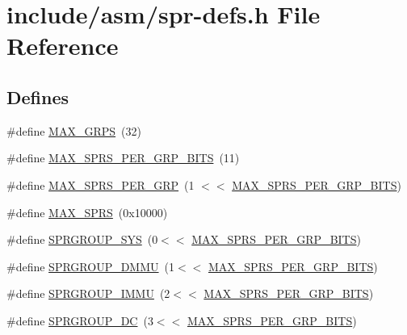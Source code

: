 \hypertarget{spr-defs_8h}{\section{include/asm/spr-\/defs.h \-File \-Reference}
\label{spr-defs_8h}
}
\subsection*{\-Defines}
\begin{DoxyCompactItemize}
\item 
\#define \hyperlink{spr-defs_8h_a44b278760f7184302d0070c0c39f5ba8}{\-M\-A\-X\-\_\-\-G\-R\-P\-S}~(32)
\item 
\#define \hyperlink{spr-defs_8h_adcfdf6c984d5e7577cd0086d5475bfb6}{\-M\-A\-X\-\_\-\-S\-P\-R\-S\-\_\-\-P\-E\-R\-\_\-\-G\-R\-P\-\_\-\-B\-I\-T\-S}~(11)
\item 
\#define \hyperlink{spr-defs_8h_aa4038b81fb32dbdd0ed4ab955ce78dec}{\-M\-A\-X\-\_\-\-S\-P\-R\-S\-\_\-\-P\-E\-R\-\_\-\-G\-R\-P}~(1 $<$$<$ \hyperlink{spr-defs_8h_adcfdf6c984d5e7577cd0086d5475bfb6}{\-M\-A\-X\-\_\-\-S\-P\-R\-S\-\_\-\-P\-E\-R\-\_\-\-G\-R\-P\-\_\-\-B\-I\-T\-S})
\item 
\#define \hyperlink{spr-defs_8h_ad0181a4ab5f0eecb77ac80cc860a3c1c}{\-M\-A\-X\-\_\-\-S\-P\-R\-S}~(0x10000)
\item 
\#define \hyperlink{spr-defs_8h_a5fa75eea4be01ea7e7fb6804ab4b2774}{\-S\-P\-R\-G\-R\-O\-U\-P\-\_\-\-S\-Y\-S}~(0$<$$<$ \hyperlink{spr-defs_8h_adcfdf6c984d5e7577cd0086d5475bfb6}{\-M\-A\-X\-\_\-\-S\-P\-R\-S\-\_\-\-P\-E\-R\-\_\-\-G\-R\-P\-\_\-\-B\-I\-T\-S})
\item 
\#define \hyperlink{spr-defs_8h_a9b7adb6ad3625a7d1f74f61b683b0a5e}{\-S\-P\-R\-G\-R\-O\-U\-P\-\_\-\-D\-M\-M\-U}~(1$<$$<$ \hyperlink{spr-defs_8h_adcfdf6c984d5e7577cd0086d5475bfb6}{\-M\-A\-X\-\_\-\-S\-P\-R\-S\-\_\-\-P\-E\-R\-\_\-\-G\-R\-P\-\_\-\-B\-I\-T\-S})
\item 
\#define \hyperlink{spr-defs_8h_a41a63359a51148fda8341ba88648773e}{\-S\-P\-R\-G\-R\-O\-U\-P\-\_\-\-I\-M\-M\-U}~(2$<$$<$ \hyperlink{spr-defs_8h_adcfdf6c984d5e7577cd0086d5475bfb6}{\-M\-A\-X\-\_\-\-S\-P\-R\-S\-\_\-\-P\-E\-R\-\_\-\-G\-R\-P\-\_\-\-B\-I\-T\-S})
\item 
\#define \hyperlink{spr-defs_8h_a3af62c82d89656aca627f13a831ad9f6}{\-S\-P\-R\-G\-R\-O\-U\-P\-\_\-\-D\-C}~(3$<$$<$ \hyperlink{spr-defs_8h_adcfdf6c984d5e7577cd0086d5475bfb6}{\-M\-A\-X\-\_\-\-S\-P\-R\-S\-\_\-\-P\-E\-R\-\_\-\-G\-R\-P\-\_\-\-B\-I\-T\-S})
\item 
$$
\end{DoxyCompactItemize}
